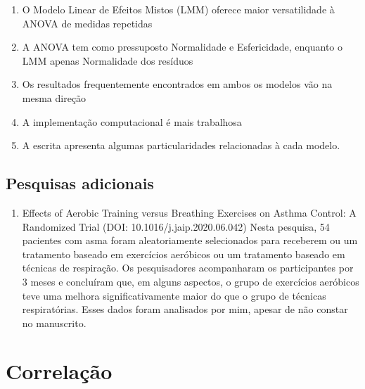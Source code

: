 \documentclass[
]{book}
\providecommand{\tightlist}{%
  \setlength{\itemsep}{0pt}\setlength{\parskip}{0pt}}
\begin{document}
\begin{explore}

\begin{enumerate}
\def\labelenumi{\arabic{enumi}.}
\tightlist
\item
  O Modelo Linear de Efeitos Mistos (LMM) oferece maior versatilidade à
  ANOVA de medidas repetidas\\
\item
  A ANOVA tem como pressuposto Normalidade e Esfericidade, enquanto o
  LMM apenas Normalidade dos resíduos
\item
  Os resultados frequentemente encontrados em ambos os modelos vão na
  mesma direção\\
\item
  A implementação computacional é mais trabalhosa\\
\item
  A escrita apresenta algumas particularidades relacionadas à cada
  modelo.\\
\end{enumerate}

\end{explore}

\hypertarget{pesquisas-adicionais-4}{%
\section{Pesquisas adicionais}\label{pesquisas-adicionais-4}}

\begin{enumerate}
\def\labelenumi{\arabic{enumi}.}
\tightlist
\item
  Effects of Aerobic Training versus Breathing Exercises on Asthma
  Control: A Randomized Trial (DOI: 10.1016/j.jaip.2020.06.042) Nesta
  pesquisa, 54 pacientes com asma foram aleatoriamente selecionados para
  receberem ou um tratamento baseado em exercícios aeróbicos ou um
  tratamento baseado em técnicas de respiração. Os pesquisadores
  acompanharam os participantes por 3 meses e concluíram que, em alguns
  aspectos, o grupo de exercícios aeróbicos teve uma melhora
  significativamente maior do que o grupo de técnicas respiratórias.
  Esses dados foram analisados por mim, apesar de não constar no
  manuscrito.
\end{enumerate}

\hypertarget{correlauxe7uxe3o}{%
\chapter{Correlação}\label{correlauxe7uxe3o}}
\end{document}
